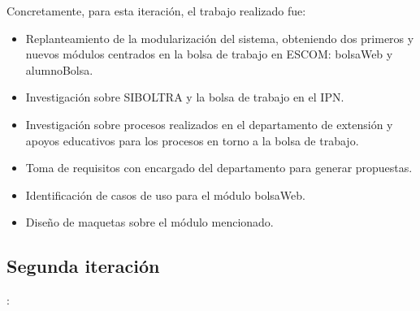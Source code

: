 \newline
Concretamente, para esta iteración, el trabajo realizado fue: 
\begin{itemize}
	\item Replanteamiento de la modularización del sistema, obteniendo dos primeros y nuevos módulos centrados en la bolsa de trabajo en ESCOM: bolsaWeb y alumnoBolsa.
	\item Investigación sobre SIBOLTRA y la bolsa de trabajo en el IPN.
	\item Investigación sobre procesos realizados en el departamento de extensión y apoyos educativos para los procesos en torno a la bolsa de trabajo.
	\item Toma de requisitos con encargado del departamento para generar propuestas.
	\item Identificación de casos de uso para el módulo bolsaWeb.
	\item Diseño de maquetas sobre el módulo mencionado.
\end{itemize}


\subsection{Segunda iteración}: 

